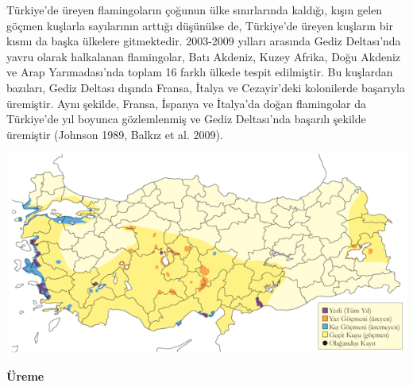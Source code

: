 \documentclass[
  letterpaper,
  DIV=11,
  numbers=noendperiod]{scrreprt}
\begin{document}
Türkiye'de üreyen flamingoların çoğunun ülke sınırlarında kaldığı, kışın
gelen göçmen kuşlarla sayılarının arttığı düşünülse de, Türkiye'de
üreyen kuşların bir kısmı da başka ülkelere gitmektedir. 2003-2009
yılları arasında Gediz Deltası'nda yavru olarak halkalanan flamingolar,
Batı Akdeniz, Kuzey Afrika, Doğu Akdeniz ve Arap Yarımadası'nda toplam
16 farklı ülkede tespit edilmiştir. Bu kuşlardan bazıları, Gediz Deltası
dışında Fransa, İtalya ve Cezayir'deki kolonilerde başarıyla üremiştir.
Aynı şekilde, Fransa, İspanya ve İtalya'da doğan flamingolar da
Türkiye'de yıl boyunca gözlemlenmiş ve Gediz Deltası'nda başarılı
şekilde üremiştir (Johnson 1989, Balkız et al. 2009).

\includegraphics{images/harita_Page_056.png}

\textbf{Üreme}
\end{document}
